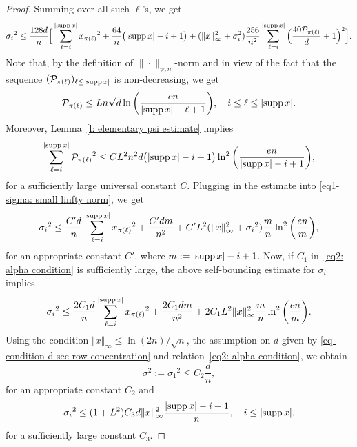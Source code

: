 \documentclass[12pt]{article}
\theoremstyle{definition}
\theoremstyle{plain}
\newcommand{\supp}{{\rm supp\,}}
\def\pvector{{\mathcal P}}
\begin{document}
\begin{proof}
Summing over all such $\ell$'s, we get
\begin{equation}\label{eq1-sigma: small linfty norm}
{\sigma_i}^2
\leq \frac{128d}{n}\Big[\sum_{\ell=i}^{|\supp x|}{x_{\pi(\ell)}}^2+\frac{64}{n}\big(|\supp x|-i+1\big)+
(\Vert x\Vert_\infty^2+\sigma_i^2)\frac{256}{n^2}\sum_{\ell=i}^{\vert\supp x\vert}\Big(\frac{40\pvector_{\pi(\ell)}}{d}+1\Big)^2\Big].
\end{equation}
Note that, by the definition of $\|\cdot\|_{\psi,n}$-norm and in view of the fact that the sequence $(\pvector_{\pi(\ell)})_{\ell\leq |\supp x|}$
is non-decreasing, we get
\begin{equation}\label{eq-order-estimate-P_i}
\pvector_{\pi(\ell)}\leq Ln\sqrt{d}\ln\bigg(\frac{en}{|\supp x|-\ell+1}\bigg),\quad i\leq \ell\leq |\supp x|.
\end{equation}
Moreover, Lemma~\ref{l: elementary psi estimate} implies
$$
\sum_{\ell=i}^{|\supp x|}{\pvector_{\pi(\ell)}}^2
\leq CL^2n^2d\big(|\supp x|-i+1\big)\ln^2\bigg(\frac{en}{|\supp x|-i+1}\bigg),
$$
for a sufficiently large universal constant $C$.
Plugging in the estimate into \eqref{eq1-sigma: small linfty norm}, we get
$$
{\sigma_i}^2\leq \frac{C' d}{n}\sum_{\ell=i}^{|\supp x|}{x_{\pi(\ell)}}^2 +\frac{C'dm}{n^2}
+C' L^2(\Vert x\Vert_\infty^2+{\sigma_i}^2)\frac{m}{n}\ln^2\bigg(\frac{en}{m}\bigg),
$$
for an appropriate constant $C'$, where $m:=|\supp x|-i+1$.
Now, if $C_1$ in~\eqref{eq2: alpha condition} is sufficiently large, the above self-bounding estimate for $\sigma_i$ implies
$$
{\sigma_i}^2\leq 
\frac{2C_1 d}{n}\sum_{\ell=i}^{|\supp x|}{x_{\pi(\ell)}}^2 +\frac{2C_1dm}{n^2}
+2C_1L^2\Vert x\Vert_\infty^2\frac{m}{n}\ln^2\bigg(\frac{en}{m}\bigg).
$$
Using the condition $\Vert x\Vert_\infty\leq \ln(2n)/\sqrt{n}$, the assumption on $d$ given by
\eqref{eq-condition-d-sec-row-concentration} and relation~\eqref{eq2: alpha condition}, 
we obtain
$$
\sigma^2:={\sigma_1}^2\leq C_2\frac{d}{n},
$$
for an appropriate constant $C_2$ and 
$$
{\sigma_i}^2\leq (1+L^2)C_3d\Vert x\Vert_\infty^2\frac{|\supp x|-i+1}{n},\quad i\leq |\supp x|,
$$
for a sufficiently large constant $C_3$. 


\medskip


\end{proof}
\end{document}
